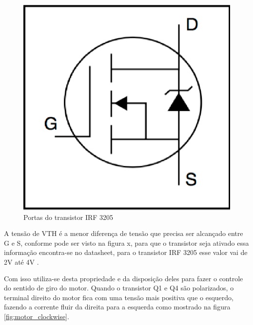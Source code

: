 \begin{figure}[!htb]
	\centering
	\includegraphics[keepaspectratio=true,scale=0.8]{figuras/referencialteorico/portas_irf_3205}
	\caption{Portas do transistor IRF 3205 \cite{datasheet_irf_3205}}
	\label{fig:portas_transistor_irf}
\end{figure}

A tensão de VTH é a menor diferença de tensão que precisa ser alcançado entre G e S, conforme pode ser visto na figura x, para que o transistor seja ativado essa informação encontra-se no datasheet, para o transistor IRF 3205 esse valor vai de 2V até 4V \cite{datasheet_irf_3205}.

Com isso utiliza-se desta propriedade e da disposição deles para fazer o controle do sentido de giro do motor. Quando o transistor Q1 e Q4 são polarizados, o terminal direito do motor fica com uma tensão mais positiva que o esquerdo, fazendo a corrente fluir da direita para a esquerda como mostrado na figura \ref{fig:motor_clockwise}.

